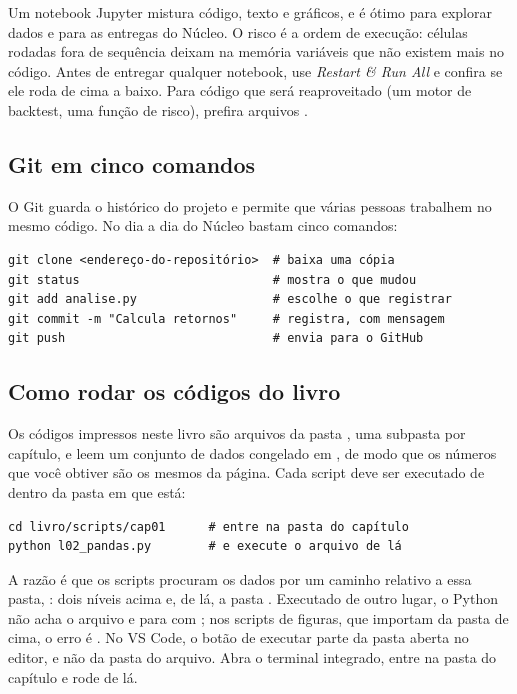 Um notebook Jupyter mistura código, texto e gráficos, e é ótimo para explorar dados e para as entregas do Núcleo. O risco é a ordem de execução: células rodadas fora de sequência deixam na memória variáveis que não existem mais no código. Antes de entregar qualquer notebook, use \emph{Restart \& Run All} e confira se ele roda de cima a baixo. Para código que será reaproveitado (um motor de backtest, uma função de risco), prefira arquivos .

\subsection{Git em cinco comandos}

O Git guarda o histórico do projeto e permite que várias pessoas trabalhem no mesmo código. No dia a dia do Núcleo bastam cinco comandos:

\begin{lstlisting}[style=terminal]
git clone <endereço-do-repositório>  # baixa uma cópia
git status                           # mostra o que mudou
git add analise.py                   # escolhe o que registrar
git commit -m "Calcula retornos"     # registra, com mensagem
git push                             # envia para o GitHub
\end{lstlisting}

\subsection{Como rodar os códigos do livro}
\label{sec:c01-rodar}

Os códigos impressos neste livro são arquivos da pasta , uma subpasta por capítulo, e leem um conjunto de dados congelado em , de modo que os números que você obtiver são os mesmos da página. Cada script deve ser executado de dentro da pasta em que está:

\begin{lstlisting}[style=terminal]
cd livro/scripts/cap01      # entre na pasta do capítulo
python l02_pandas.py        # e execute o arquivo de lá
\end{lstlisting}

A razão é que os scripts procuram os dados por um caminho relativo a essa pasta, : dois níveis acima e, de lá, a pasta . Executado de outro lugar, o Python não acha o arquivo e para com ; nos scripts de figuras, que importam  da pasta de cima, o erro é . No VS Code, o botão de executar parte da pasta aberta no editor, e não da pasta do arquivo. Abra o terminal integrado, entre na pasta do capítulo e rode de lá.

